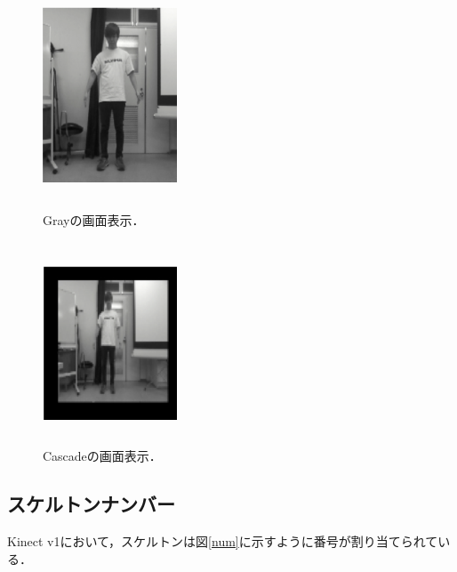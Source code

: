 \begin{figure}[p]
    \begin{minipage}{0.5\hsize}
     \begin{center}
      \includegraphics[width=4cm,height=6cm]{image/gray.png}
     \end{center}
     \caption[Grayの画面表示]{Grayの画面表示．}
     \label{gray}
    \end{minipage}
    \begin{minipage}{0.5\hsize}
     \begin{center}
      \includegraphics[width=4cm,height=6cm]{image/cascade.png}
     \end{center}
     \caption[Cascadeの画面表示]{Cascadeの画面表示．}
     \label{cascade}
    \end{minipage}
\end{figure}

\clearpage

\subsection{スケルトンナンバー}
Kinect v1において，スケルトンは図\ref{num}に示すように番号が割り当てられている．

